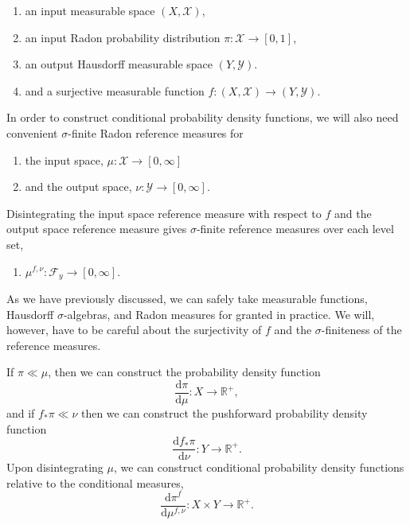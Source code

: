 \documentclass[
  letterpaper,
  DIV=11,
  numbers=noendperiod]{scrartcl}
\providecommand{\tightlist}{%
  \setlength{\itemsep}{0pt}\setlength{\parskip}{0pt}}\usepackage{longtable,booktabs,array}
\begin{document}
\begin{enumerate}
\def\labelenumi{\arabic{enumi}.}
\tightlist
\item
  an input measurable space \((X, \mathcal{X})\),
\item
  an input Radon probability distribution
  \(\pi : \mathcal{X} \rightarrow [0, 1]\),
\item
  an output Hausdorff measurable space \((Y, \mathcal{Y})\).
\item
  and a surjective measurable function
  \(f: (X, \mathcal{X}) \rightarrow (Y, \mathcal{Y})\).
\end{enumerate}

In order to construct conditional probability density functions, we will
also need convenient \(\sigma\)-finite Radon reference measures for

\begin{enumerate}
\def\labelenumi{\arabic{enumi}.}
\setcounter{enumi}{4}
\tightlist
\item
  the input space, \(\mu : \mathcal{X} \rightarrow [0, \infty]\)
\item
  and the output space, \(\nu : \mathcal{Y} \rightarrow [0, \infty]\).
\end{enumerate}

Disintegrating the input space reference measure with respect to \(f\)
and the output space reference measure gives \(\sigma\)-finite reference
measures over each level set,

\begin{enumerate}
\def\labelenumi{\arabic{enumi}.}
\setcounter{enumi}{6}
\tightlist
\item
  \(\mu^{f, \nu} : \mathcal{F}_{y} \rightarrow [0, \infty]\).
\end{enumerate}

As we have previously discussed, we can safely take measurable
functions, Hausdorff \(\sigma\)-algebras, and Radon measures for granted
in practice. We will, however, have to be careful about the surjectivity
of \(f\) and the \(\sigma\)-finiteness of the reference measures.

If \(\pi \ll \mu\), then we can construct the probability density
function \[
\frac{ \mathrm{d}  \pi }{ \mathrm{d}  \mu  } : X \rightarrow \mathbb{R}^{+},
\] and if \(f_{*} \pi \ll \nu\) then we can construct the pushforward
probability density function \[
\frac{ \mathrm{d}  f_{*} \pi }{ \mathrm{d}  \nu  } : Y \rightarrow \mathbb{R}^{+}.
\] Upon disintegrating \(\mu\), we can construct conditional probability
density functions relative to the conditional measures, \[
\frac{ \mathrm{d}  \pi^{f} }{ \mathrm{d}  \mu^{f, \nu}  }
: X \times Y \rightarrow \mathbb{R}^{+}.
\]
\end{document}
